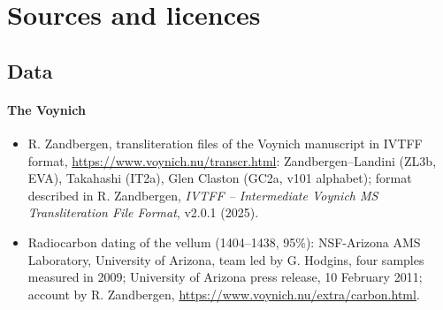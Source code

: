 \section{Sources and licences}

\subsection{Data}

\paragraph{The Voynich}
\begin{itemize}
\item R. Zandbergen, transliteration files of the Voynich manuscript in IVTFF format,
  \url{https://www.voynich.nu/transcr.html}: Zandbergen--Landini (ZL3b, EVA), Takahashi (IT2a), Glen Claston (GC2a, v101
  alphabet); format described in R. Zandbergen, \emph{IVTFF -- Intermediate Voynich MS Transliteration File Format},
  v2.0.1 (2025).
\item Radiocarbon dating of the vellum (1404--1438, 95\%): NSF-Arizona AMS Laboratory, University of Arizona, team led by
  G. Hodgins, four samples measured in 2009; University of Arizona press release, 10 February 2011; account by R.
  Zandbergen, \url{https://www.voynich.nu/extra/carbon.html}.
\end{itemize}

